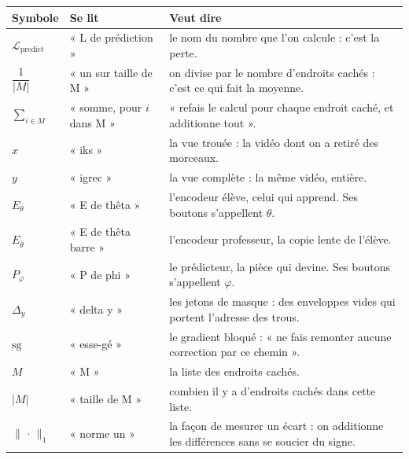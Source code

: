 \begin{center}
\footnotesize
\begin{tabular}{llp{6.1cm}}
\toprule
\textbf{Symbole} & \textbf{Se lit} & \textbf{Veut dire} \\
\midrule
$\mathcal{L}_{\text{predict}}$ & « L de prédiction » &
le nom du nombre que l'on calcule : c'est la perte. \\[3pt]

$\dfrac{1}{|M|}$ & « un sur taille de M » &
on divise par le nombre d'endroits cachés : c'est ce qui fait la
moyenne. \\[3pt]

$\displaystyle\sum_{i \in M}$ & « somme, pour $i$ dans M » &
« refais le calcul pour chaque endroit caché, et additionne tout ». \\[3pt]

$x$ & « iks » &
la vue trouée : la vidéo dont on a retiré des morceaux. \\[3pt]

$y$ & « igrec » &
la vue complète : la même vidéo, entière. \\[3pt]

$E_{\theta}$ & « E de thêta » &
l'encodeur élève, celui qui apprend. Ses boutons s'appellent $\theta$. \\[3pt]

$E_{\bar{\theta}}$ & « E de thêta barre » &
l'encodeur professeur, la copie lente de l'élève. \\[3pt]

$P_{\varphi}$ & « P de phi » &
le prédicteur, la pièce qui devine. Ses boutons s'appellent $\varphi$. \\[3pt]

$\Delta_y$ & « delta y » &
les jetons de masque : des enveloppes vides qui portent l'adresse des
trous. \\[3pt]

$\mathrm{sg}$ & « esse-gé » &
le gradient bloqué : « ne fais remonter aucune correction par ce
chemin ». \\[3pt]

$M$ & « M » &
la liste des endroits cachés. \\[3pt]

$|M|$ & « taille de M » &
combien il y a d'endroits cachés dans cette liste. \\[3pt]

$\|\,\cdot\,\|_{1}$ & « norme un » &
la façon de mesurer un écart : on additionne les différences sans se
soucier du signe. \\
\bottomrule
\end{tabular}
\end{center}

